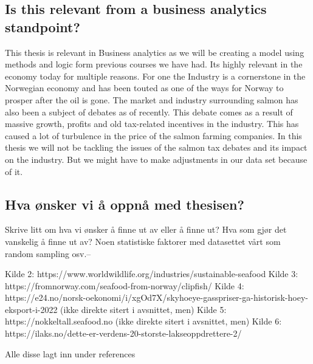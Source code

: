 \subsection{Is this relevant from a business analytics standpoint?}
This thesis is relevant in Business analytics as we will be creating a model using methods and logic form previous courses we have had. Its highly relevant in the economy today for multiple reasons. For one the Industry is a cornerstone in the Norwegian economy and has been touted as one of the ways for Norway to prosper after the oil is gone. The market and industry surrounding salmon has also been a subject of debates as of recently. This debate comes as a result of massive growth, profits and old tax-related incentives in the industry. This has caused a lot of turbulence in the price of the salmon farming companies. In this thesis we will not be tackling the issues of the salmon tax debates and its impact on the industry. But we might have to make adjustments in our data set because of it.

\subsection{Hva ønsker vi å oppnå med thesisen?}
Skrive litt om hva vi ønsker å finne ut av eller å finne ut?
Hva som gjør det vanskelig å finne ut av?
Noen statistiske faktorer med datasettet vårt som random sampling osv.--

Kilde 2: https://www.worldwildlife.org/industries/sustainable-seafood
Kilde 3: https://fromnorway.com/seafood-from-norway/clipfish/
Kilde 4: https://e24.no/norsk-oekonomi/i/xgOd7X/skyhoeye-gasspriser-ga-historisk-hoey-eksport-i-2022 (ikke direkte sitert i avsnittet, men)
Kilde 5: https://nokkeltall.seafood.no (ikke direkte sitert i avsnittet, men)
Kilde 6: https://ilaks.no/dette-er-verdens-20-storste-lakseoppdrettere-2/

Alle disse lagt inn under references